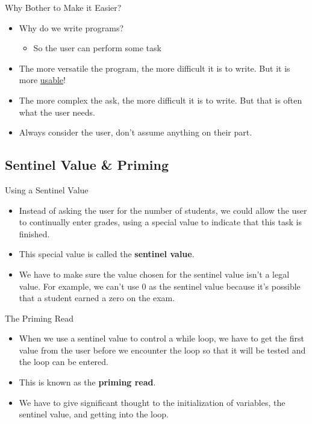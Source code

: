 \documentclass[graphics]{beamer}
\begin{document}
\begin{frame}{Why Bother to Make it Easier?}
    \begin{itemize}
        \item Why do we write programs?
        \begin{itemize}
            \item So the user can perform some task
        \end{itemize}
        \item The more versatile the program, the more difficult it is to write. But it is more \underline{usable}!
        \item The more complex the ask, the more difficult it is to write. But that is often what the user needs.
        \item Always consider the user, don't assume anything on their part.
    \end{itemize}
\end{frame}

\subsection{Sentinel Value \& Priming}
\begin{frame}{Using a Sentinel Value}
    \begin{itemize}
        \item Instead of asking the user for the number of students, we could allow the user to continually enter grades, using a special value to indicate that this task is finished.
        \item This special value is called the \textbf{sentinel value}.
        \item We have to make sure the value chosen for the sentinel value isn't a legal value. For example, we can't use 0 as the sentinel value because it's possible that a student earned a zero on the exam.
    \end{itemize}
\end{frame}

\begin{frame}{The Priming Read}
    \begin{itemize}
        \item When we use a sentinel value to control a while loop, we have to get the first value from the user before we encounter the loop so that it will be tested and the loop can be entered.
        \item This is known as the \textbf{priming read}.
        \item We have to give significant thought to the initialization of variables, the sentinel value, and getting into the loop.
    \end{itemize}
\end{frame}
\end{document}
